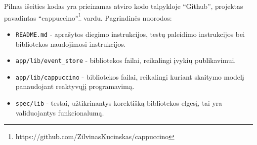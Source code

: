 Pilnas išeities kodas yra prieinamas atviro kodo talpykloje ``Github'', projektas pavadintas ``cappuccino''\footnote{https://github.com/ZilvinasKucinskas/cappuccino} vardu. Pagrindinės nuorodos:

\begin{itemize}
  \item \lstinline|README.md| - aprašytos diegimo instrukcijos, testų paleidimo instrukcijos bei bibliotekos naudojimosi instrukcijos.
  \item \lstinline|app/lib/event_store| - bibliotekos failai, reikalingi įvykių publikavimui.
  \item \lstinline|app/lib/cappuccino| - bibliotekos failai, reikalingi kuriant skaitymo modelį panaudojant reaktyvųjį programavimą.
  \item \lstinline|spec/lib| - testai, užtikrinantys korektišką bibliotekos elgesį, tai yra validuojantys funkcionalumą.
\end{itemize}

